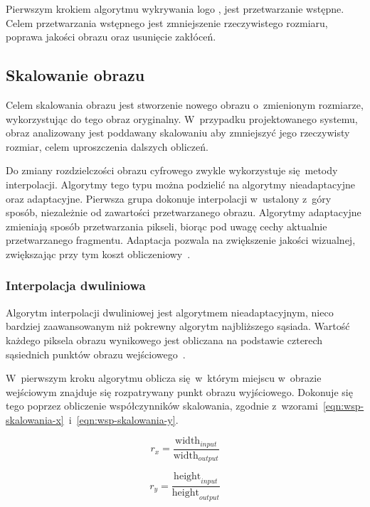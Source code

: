 Pierwszym krokiem algorytmu wykrywania logo \bk, jest przetwarzanie wstępne. Celem przetwarzania wstępnego jest zmniejszenie rzeczywistego rozmiaru, poprawa jakości obrazu oraz usunięcie zakłóceń.

\subsection{Skalowanie obrazu}
Celem skalowania obrazu jest stworzenie nowego obrazu o~zmienionym rozmiarze, wykorzystując do tego obraz oryginalny. W~przypadku projektowanego systemu, obraz analizowany jest poddawany skalowaniu aby zmniejszyć jego rzeczywisty rozmiar, celem uproszczenia dalszych obliczeń.

Do zmiany rozdzielczości obrazu cyfrowego zwykle wykorzystuje się metody interpolacji. Algorytmy tego typu można podzielić na algorytmy nieadaptacyjne oraz adaptacyjne. Pierwsza grupa dokonuje interpolacji w~ustalony z~góry sposób, niezależnie od zawartości przetwarzanego obrazu. Algorytmy adaptacyjne zmieniają sposób przetwarzania pikseli, biorąc pod uwagę cechy aktualnie przetwarzanego fragmentu. Adaptacja pozwala na zwiększenie jakości wizualnej, zwiększając przy tym koszt obliczeniowy~\cite{swierczynski2008podwyzszanie}.

\subsubsection{Interpolacja dwuliniowa}
Algorytm interpolacji dwuliniowej jest algorytmem nieadaptacyjnym, nieco bardziej zaawansowanym niż pokrewny algorytm najbliższego sąsiada. Wartość każdego piksela obrazu wynikowego jest obliczana na podstawie czterech sąsiednich punktów obrazu wejściowego~\cite{algorytmy:bilinear}.

W~pierwszym kroku algorytmu oblicza się w~którym miejscu w~obrazie wejściowym znajduje się rozpatrywany punkt obrazu wyjściowego. Dokonuje się tego poprzez obliczenie współczynników skalowania, zgodnie z~wzorami~\ref{eqn:wsp-skalowania-x}~i~\ref{eqn:wsp-skalowania-y}.

\begin{equation}
    \label{eqn:wsp-skalowania-x}
    r_{x} = \frac{\mathrm{width}_{input}}{\mathrm{width}_{output}}
\end{equation}

\begin{equation}
    \label{eqn:wsp-skalowania-y}
    r_{y} = \frac{\mathrm{height}_{input}}{\mathrm{height}_{output}}
\end{equation}

